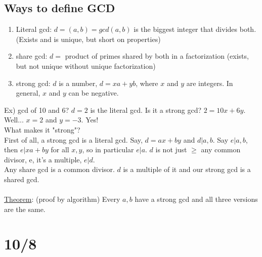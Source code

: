 \documentclass[13pt]{article}
\begin{document}
	\subsection*{Ways to define GCD}
		\begin{enumerate}
			\item Literal gcd: $d = (a, b) = gcd(a,b)$ is the biggest integer that
				divides both. (Exists and is unique, but short on properties)
			\item share gcd: $d = $ product of primes shared by both in a 
				factorization (exists, but not unique without unique factorization)
			\item strong gcd: $d$ is a number, $d = xa + yb$, where $x$ and $y$ 
				are integers. In general, $x$ and $y$ can be negative.
		\end{enumerate}
		Ex) gcd of 10 and 6? $d = 2$ is the literal gcd. Is it a strong gcd?
			$2 = 10x + 6y$. Well... $x = 2$ and $y = -3$. Yes!\\
		What makes it "strong"?\\
		First of all, a strong gcd is a literal gcd. Say, $d = ax + by$ and 
		$d | a,b$. Say $e | a,b$, then $e | xa + by$ for all $x,y$, so in 
		particular $e | a$. $d$ is not just $\ge$ any common divisor, e, it's a
		multiple, $e | d$.\\
		Any share gcd is a common divisor. $d$ is a multiple of it and our 
		strong gcd is a shared gcd.\\\\
		\underline{Theorem}: (proof by algorithm) Every $a,b$ have a strong gcd
		and all three versions are the same.

\section*{10/8}
\end{document}
